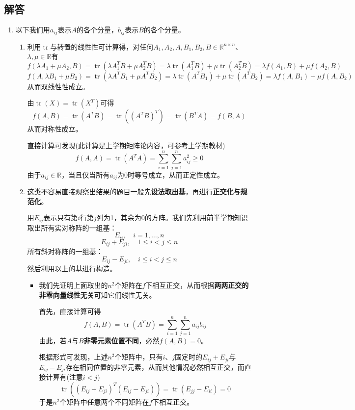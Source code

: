 \documentclass[a4paper,UTF8,fontset=windows,AutoFakeBold]{ctexart}
\DeclareMathOperator{\tr}{tr}
\newcommand*{\note}{\noindent *}
\begin{document}
\subsection{解答}
\begin{enumerate}
    \item
    以下我们用$a_{ij}$表示$A$的各个分量，$b_{ij}$表示$B$的各个分量。
    \begin{enumerate}
        \item 利用$\tr$与转置的线性性可计算得，对任何$A_1,A_2,A,B_1,B_2,B\in\mathbb{R}^{n\times n}$、$\lambda,\mu\in\mathbb{R}$有
        $$f(\lambda A_1+\mu A_2,B)=\tr(\lambda A_1^TB+\mu A_2^TB)=\lambda\tr(A_1^TB)+\mu\tr(A_2^TB)=\lambda f(A_1,B)+\mu f(A_2,B)$$
        $$f(A,\lambda B_1+\mu B_2)=\tr(\lambda A^TB_1+\mu A^TB_2)=\lambda\tr(A^TB_1)+\mu\tr(A^TB_2)=\lambda f(A,B_1)+\mu f(A,B_2)$$
        从而双线性性成立。

        由$\tr(X)=\tr(X^T)$可得
        $$f(A,B)=\tr(A^TB)=\tr((A^TB)^T)=\tr(B^TA)=f(B,A)$$
        从而对称性成立。

        直接计算可发现(此计算是上学期矩阵论内容，可参考上学期教材)
        $$f(A,A)=\tr(A^TA)=\sum_{i=1}^n\sum_{j=1}^na_{ij}^2\ge0$$
        由于$a_{ij}\in\mathbb{R}$，当且仅当所有$a_{ij}$为0时等号成立，从而正定性成立。
        
        \item 
        \note 这类不容易直接观察出结果的题目一般先\textbf{设法取出基}，再进行\textbf{正交化与规范化}。

        用$E_{ij}$表示只有第$i$行第$j$列为1，其余为0的方阵。我们先利用前半学期知识取出所有实对称阵的一组基：
        $$E_{ii},\quad i=1,\dots,n$$
        $$E_{ij}+E_{ji},\quad 1\le i<j\le n$$
        所有斜对称阵的一组基：
        $$E_{ij}-E_{ji},\quad i\le i<j\le n$$
        然后利用以上的基进行构造。

        \begin{itemize}
            \item 我们先证明上面取出的$n^2$个矩阵在$f$下相互正交，从而根据\textbf{两两正交的非零向量线性无关}可知它们线性无关。
            
            首先，直接计算可得
            $$f(A,B)=\tr(A^TB)=\sum_{i=1}^n\sum_{j=1}^na_{ij}b_{ij}$$
            由此，若$A$与$B$\textbf{非零元素位置不同}，必然$f(A,B)=0$。

            根据形式可发现，上述$n^2$个矩阵中，只有$i$、$j$固定时的$E_{ij}+E_{ji}$与$E_{ij}-E_{ji}$存在相同位置的非零元素，从而其他情况必然相互正交，而直接计算有(注意$i<j$)
            $$\tr((E_{ij}+E_{ji})^T(E_{ij}-E_{ji}))=\tr(E_{jj}-E_{ii})=0$$
            于是$n^2$个矩阵中任意两个不同矩阵在$f$下相互正交。


\end{itemize}
\end{enumerate}
\end{enumerate}
\end{document}
